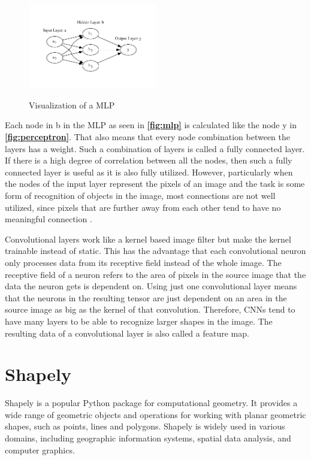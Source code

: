 \documentclass[10pt]{book}
\newcommand{\figureref}[1]{\textbf{\autoref{#1}}}
\begin{document}
\begin{figure}
  \caption{Visualization of a \ac{MLP}}
  \includegraphics[width=0.5\textwidth]{graph/mlp}
  \label{fig:mlp} 
\end{figure}

Each node in b in the \ac{MLP} as seen in \figureref{fig:mlp} is calculated like the node y in \figureref{fig:perceptron}. That also means that every node combination between the layers has a weight. Such a combination of layers is called a fully connected layer. If there is a high degree of correlation between all the nodes, then such a fully connected layer is useful as it is also fully utilized. However, particularly when the nodes of the input layer represent the pixels of an image and the task is some form of recognition of objects in the image, most connections are not well utilized, since pixels that are further away from each other tend to have no meaningful connection \cite{aghdam2017guide}.

Convolutional layers work like a kernel based image filter but make the kernel trainable instead of static. This has the advantage that each convolutional neuron only processes data from its receptive field instead of the whole image. The receptive field of a neuron refers to the area of pixels in the source image that the data the neuron gets is dependent on. Using just one convolutional layer means that the neurons in the resulting tensor are just dependent on an area in the source image as big as the kernel of that convolution. Therefore, \acp{CNN} tend to have many layers to be able to recognize larger shapes in the image. The resulting data of a convolutional layer is also called a feature map. 

\section{Shapely} %

Shapely is a popular Python package for computational geometry. It provides a wide range of geometric objects and operations for working with planar geometric shapes, such as points, lines and polygons. Shapely is widely used in various domains, including geographic information systems, spatial data analysis, and computer graphics.
\end{document}
